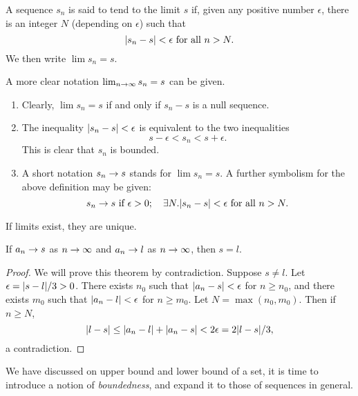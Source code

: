 \documentclass[main.tex]{subfiles}
\begin{document}
	\begin{definition}
		A sequence $s_n$ is said to tend to the limit $s$ if, given any positive number $\epsilon$, there is an integer $N$ (depending on $\epsilon$) such that
		\begin{equation*}
		\abs*{s_n - s} < \epsilon \text{ for all } n > N.
		\end{equation*}
		We then write $\lim s_n = s$.
	\end{definition}
	A more clear notation $\lim_{n \ra \infty} s_n = s$ can be given.
	\begin{note}
		\begin{enumerate}
			\item Clearly, $\lim s_n = s$ if and only if $s_n - s$ is a null sequence.
			
			\item The inequality $\abs*{s_n - s} < \epsilon$ is equivalent to the two inequalities
			\begin{equation*}
			s - \epsilon < s_n < s + \epsilon.
			\end{equation*}
			This is clear that $s_n$ is bounded.
			
			\item A short notation $s_n \ra s$ stands for $\lim s_n = s$. A further symbolism for the above definition may be given:
			\begin{equation*}
			s_n \ra s \text{ if } \epsilon >0;\quad \exists N.\abs*{s_n - s} < \epsilon \text{ for all } n > N.
			\end{equation*}
		\end{enumerate}
	\end{note}
	If limits exist, they are unique.
	\begin{theorem}
		If $a_n \ra s$ as $n \ra \infty$ and $a_n \ra l$ as $n \ra \infty$, then $s = l$.
	\end{theorem}
	\begin{proof}
		We will prove this theorem by contradiction. Suppose $s \neq l$. Let $\epsilon = \abs{s - l}/3 > 0$. There exists $n_0$ such that $\abs{a_n - s} < \epsilon$ for $n \geq n_0$, and there exists $m_0$ such that $\abs{a_n - l} < \epsilon$ for $n \geq m_0$. Let $N = \max(n_0 , m_0)$. Then if $n \geq N$,
		\begin{equation*}
		\abs{l - s} \leq \abs{a_n - l} + \abs{a_n - s} < 2\epsilon = 2\abs{l - s}/3,
		\end{equation*}
		a contradiction.
	\end{proof}
	We have discussed on upper bound and lower bound of a set, it is time to introduce a notion of \textit{boundedness}, and expand it to those of sequences in general.
\end{document}
